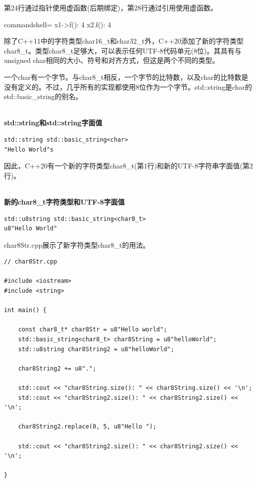 第24行通过指针使用虚函数(后期绑定)，第28行通过引用使用虚函数。

\begin{tcblisting}{commandshell={}}
x1->f(): 4
x2.f(): 4
\end{tcblisting}


除了C++11中的字符类型char16\_t和char32\_t外，C++20添加了新的字符类型char8\_t。类型char8\_t足够大，可以表示任何UTF-8代码单元(8位)。其具有与unsigned char相同的大小、符号和对齐方式，但这是两个不同的类型。

\begin{tcolorbox}[breakable,enhanced jigsaw,colback=blue!5!white,colframe=blue!75!black,title={char和char8\_t}]
一个char有一个字节。与char8\_t相反，一个字节的比特数，以及char的比特数是没有定义的。不过，几乎所有的实现都使用8位作为一个字节。std::string是char的std::basic\_string的别名。

\hspace*{\fill} \\ %
\noindent
\textbf{std::string和std::string字面值}
\begin{lstlisting}[style=styleCXX]
std::string std::basic_string<char>
"Hello World"s
\end{lstlisting}
\end{tcolorbox}

因此，C++20有一个新的字符类型char8\_t(第1行)和新的UTF-8字符串字面值(第2行)。

\hspace*{\fill} \\ %
\noindent
\textbf{新的char8\_t字符类型和UTF-8字面值}
\begin{lstlisting}[style=styleCXX]
std::u8string std::basic_string<char8_t>
u8"Hello World"
\end{lstlisting}

char8Str.cpp展示了新字符类型char8\_t的用法。

\begin{lstlisting}[style=styleCXX]
// char8Str.cpp

#include <iostream>
#include <string>

int main() {
	
	const char8_t* char8Str = u8"Hello world";
	std::basic_string<char8_t> char8String = u8"helloWorld";
	std::u8string char8String2 = u8"helloWorld";
	
	char8String2 += u8".";
	
	std::cout << "char8String.size(): " << char8String.size() << '\n';
	std::cout << "char8String2.size(): " << char8String2.size() << '\n';
	
	char8String2.replace(0, 5, u8"Hello ");
	
	std::cout << "char8String2.size(): " << char8String2.size() << '\n';

}
\end{lstlisting}

